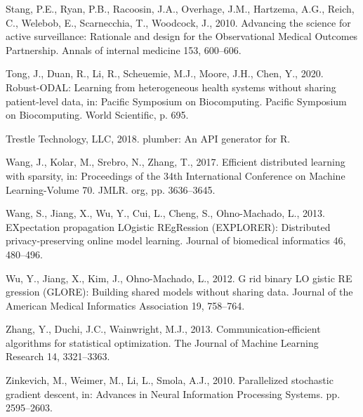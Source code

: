 \documentclass[]{elsarticle} %
\newlength{\cslhangindent}
\newenvironment{cslreferences}%
  {\setlength{\parindent}{0pt}%
  \everypar{\setlength{\hangindent}{\cslhangindent}}\ignorespaces}%
  {\par}
\begin{document}
\begin{cslreferences}
\leavevmode\hypertarget{ref-omop}{}%
Stang, P.E., Ryan, P.B., Racoosin, J.A., Overhage, J.M., Hartzema, A.G., Reich, C., Welebob, E., Scarnecchia, T., Woodcock, J., 2010. Advancing the science for active surveillance: Rationale and design for the Observational Medical Outcomes Partnership. Annals of internal medicine 153, 600--606.

\leavevmode\hypertarget{ref-tong2020robust}{}%
Tong, J., Duan, R., Li, R., Scheuemie, M.J., Moore, J.H., Chen, Y., 2020. Robust-ODAL: Learning from heterogeneous health systems without sharing patient-level data, in: Pacific Symposium on Biocomputing. Pacific Symposium on Biocomputing. World Scientific, p. 695.

\leavevmode\hypertarget{ref-plumber}{}%
Trestle Technology, LLC, 2018. plumber: An API generator for R.

\leavevmode\hypertarget{ref-wang2017efficient}{}%
Wang, J., Kolar, M., Srebro, N., Zhang, T., 2017. Efficient distributed learning with sparsity, in: Proceedings of the 34th International Conference on Machine Learning-Volume 70. JMLR. org, pp. 3636--3645.

\leavevmode\hypertarget{ref-explorer}{}%
Wang, S., Jiang, X., Wu, Y., Cui, L., Cheng, S., Ohno-Machado, L., 2013. EXpectation propagation LOgistic REgRession (EXPLORER): Distributed privacy-preserving online model learning. Journal of biomedical informatics 46, 480--496.

\leavevmode\hypertarget{ref-glore}{}%
Wu, Y., Jiang, X., Kim, J., Ohno-Machado, L., 2012. G rid binary LO gistic RE gression (GLORE): Building shared models without sharing data. Journal of the American Medical Informatics Association 19, 758--764.

\leavevmode\hypertarget{ref-zhang2013communication}{}%
Zhang, Y., Duchi, J.C., Wainwright, M.J., 2013. Communication-efficient algorithms for statistical optimization. The Journal of Machine Learning Research 14, 3321--3363.

\leavevmode\hypertarget{ref-zinkevich2010parallelized}{}%
Zinkevich, M., Weimer, M., Li, L., Smola, A.J., 2010. Parallelized stochastic gradient descent, in: Advances in Neural Information Processing Systems. pp. 2595--2603.
\end{cslreferences}
\end{document}
